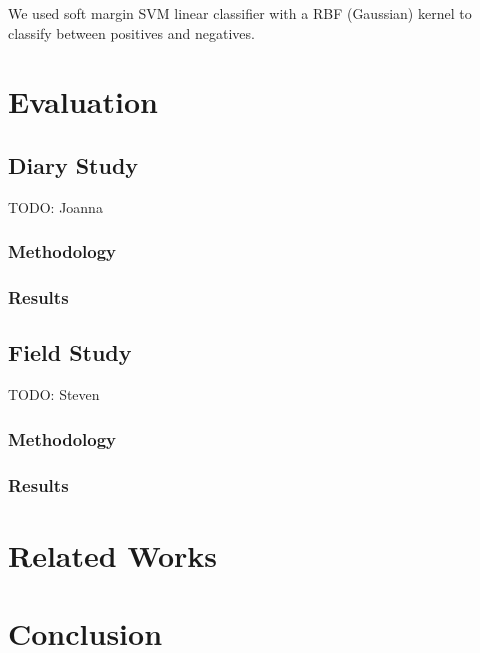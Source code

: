 \documentclass{article}
\begin{document}
We used soft margin SVM linear classifier with a RBF (Gaussian) kernel to classify between positives and negatives. 
\section{Evaluation}
\subsection{Diary Study}
TODO: Joanna
\subsubsection{Methodology}
\subsubsection{Results}

\subsection{Field Study}
TODO: Steven
\subsubsection{Methodology}
\subsubsection{Results}

\section{Related Works}
\section{Conclusion}
\end{document}
